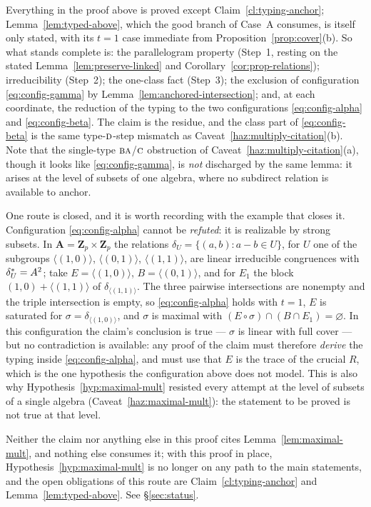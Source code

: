 \begin{hazard}\label{haz:typing-anchor}
Everything in the proof above is proved except Claim~\ref{cl:typing-anchor};
Lemma~\ref{lem:typed-above}, which the good branch of Case~A consumes, is
itself only stated, with its $t=1$ case immediate from
Proposition~\ref{prop:cover}(b). So what stands complete is: the
parallelogram property (Step~1, resting on the stated
Lemma~\ref{lem:preserve-linked} and Corollary~\ref{cor:prop-relations});
irreducibility (Step~2); the one-class fact (Step~3); the exclusion of
configuration \eqref{eq:config-gamma} by
Lemma~\ref{lem:anchored-intersection}; and, at each coordinate, the
reduction of the typing to the two configurations \eqref{eq:config-alpha}
and \eqref{eq:config-beta}. The claim is the residue, and the class part of
\eqref{eq:config-beta} is the same type-$\textup{\textsc{d}}$-step mismatch as
Caveat~\ref{haz:multiply-citation}(b). Note that the single-type
$\textup{\textsc{ba}}$/$\textup{\textsc{c}}$ obstruction of Caveat~\ref{haz:multiply-citation}(a), though it
looks like \eqref{eq:config-gamma}, is \emph{not} discharged by the same
lemma: it arises at the level of subsets of one algebra, where no subdirect
relation is available to anchor.

One route is closed, and it is worth recording with the example that closes
it. Configuration \eqref{eq:config-alpha} cannot be \emph{refuted}: it is
realizable by strong subsets. In $\mathbf A=\mathbf Z_{p}\times\mathbf Z_{p}$
the relations $\delta_{U}=\{(a,b):a-b\in U\}$, for $U$ one of the subgroups
$\langle(1,0)\rangle$, $\langle(0,1)\rangle$, $\langle(1,1)\rangle$, are
linear irreducible congruences with $\delta_{U}^{*}=A^{2}$; take
$E=\langle(1,0)\rangle$, $B=\langle(0,1)\rangle$, and for $E_{1}$ the block
$(1,0)+\langle(1,1)\rangle$ of $\delta_{\langle(1,1)\rangle}$. The three
pairwise intersections are nonempty and the triple intersection is empty, so
\eqref{eq:config-alpha} holds with $t=1$, $E$ is saturated for
$\sigma=\delta_{\langle(1,0)\rangle}$, and $\sigma$ is maximal with
$(E\circ\sigma)\cap(B\cap E_{1})=\varnothing$. In this configuration the
claim's conclusion is true --- $\sigma$ is linear with full cover --- but no
contradiction is available: any proof of the claim must therefore
\emph{derive} the typing inside \eqref{eq:config-alpha}, and must use that
$E$ is the trace of the crucial $R$, which is the one hypothesis the
configuration above does not model. This is also why
Hypothesis~\ref{hyp:maximal-mult} resisted every attempt at the level of
subsets of a single algebra (Caveat~\ref{haz:maximal-mult}): the statement
to be proved is not true at that level.

Neither the claim nor anything else in this proof cites
Lemma~\ref{lem:maximal-mult}, and nothing else consumes it; with this proof
in place, Hypothesis~\ref{hyp:maximal-mult} is no longer on any path to the
main statements, and the open obligations of this route are
Claim~\ref{cl:typing-anchor} and Lemma~\ref{lem:typed-above}. See
\S\ref{sec:status}.
\end{hazard}

